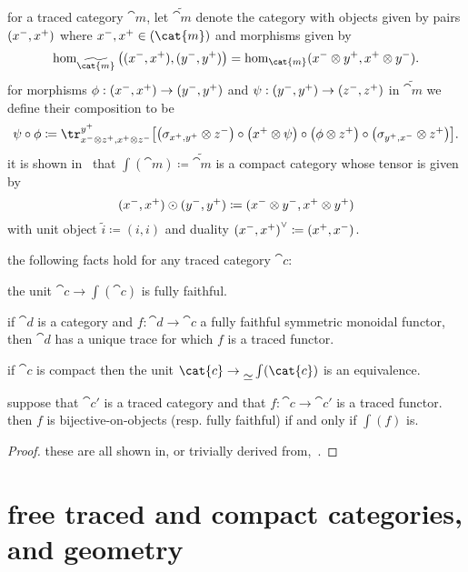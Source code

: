 \documentclass[11pt,oneside,article]{memoir}
\begin{document}
for a traced category $\cat{m}$, let $\widetilde{\cat{m}}$ denote the category with
objects given by pairs $(x^-,x^+)$ where $\inp{x},\outp{x}\in(\cat{m})$ and morphisms
given by
\[
   \hom_{\widetilde{\cat{m}}}\big((\inp{x},\outp{x}),(\inp{y},\outp{y})\big)=\hom_{\cat{m}}(\inp{x}\otimes \outp{y},\outp{x}\otimes \inp{y}).
\]
for morphisms $\phi:(x^-,x^+)\to(y^-,y^+)$ and $\psi:(y^-,y^+)\to(z^-,z^+)$ in $\widetilde{\cat{m}}$ we define their composition to be
\[
   \psi\circ\phi\coloneqq\tr^{\outp{y}}_{\inp{x}\otimes \outp{z},\outp{x}\otimes \inp{z}}\big[\big(\sigma_{\outp{x},\outp{y}}\otimes \inp{z}\big)\circ\big(\outp{x}\otimes\psi\big)\circ\big(\phi\otimes \outp{z}\big)\circ\big(\sigma_{\outp{y},\inp{x}}\otimes \outp{z}\big)\big].
\]
it is shown in~\cite{joyalstreetverity} that $\int(\cat{m})\coloneqq\widetilde{\cat{m}}$ is a compact category whose tensor is given by
\[
   (x^-,x^+)\odot(y^-,y^+)\coloneqq(x^-\otimes y^-,x^+\otimes y^+)
\]
with unit object $\tilde i\coloneqq(i,i)$ and duality ${(x^-,x^+)}^\vee\coloneqq(x^+,x^-)$.

\begin{lemma}\label{lemma:fully_faithful_and_trace}
the following facts hold for any traced category $\cat{c}$:
\begin{compactenum}[\quad i.]
   \item the unit $\cat{c}\to\int(\cat{c})$ is fully faithful.
   \item if $\cat{d}$ is a category and $f\colon\cat{d}\to\cat{c}$ a fully faithful symmetric
      monoidal functor, then $\cat{d}$ has a unique trace for which $f$ is a traced functor.
   \item if $\cat{c}$ is compact then the unit $\cat{c}\to{\raisebox{-1ex}{$\equiv$}}\int(\cat{c})$ is an equivalence.
   \item suppose that $\cat{c'}$ is a traced category and that $f\colon \cat{c}\to \cat{c}'$ is a
      traced functor. then $f$ is bijective-on-objects (resp. fully faithful) if and only if
      $\int(f)$ is.
\end{compactenum}
\end{lemma}
\begin{proof}
   these are all shown in, or trivially derived from,~\cite{joyalstreetverity}.
\end{proof}

\section{free traced and compact categories, and geometry}\label{sec:free_and_geometry}
\end{document}
